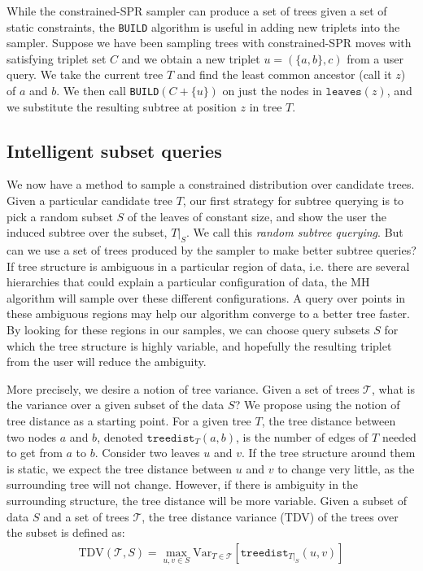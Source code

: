 While the constrained-SPR sampler can produce
a set of trees given a set of static constraints,
the \texttt{BUILD} algorithm is useful in
adding new triplets into the sampler.
Suppose we have been sampling trees with constrained-SPR moves
with satisfying triplet set $C$ 
and we obtain a new triplet $u = (\{a, b\}, c)$ from a user query. 
We take the current tree $T$ and find the least common ancestor 
(call it $z$) of $a$ and $b$. We then call 
\texttt{BUILD}$(C + \{u\})$ on just the nodes in 
$\texttt{leaves}(z)$, and 
we substitute the resulting subtree at position $z$ in tree $T$.

\subsection{Intelligent subset queries}
We now have a method to sample a constrained
distribution over candidate trees.
Given a particular candidate tree $T$,
our first strategy for subtree querying
is to pick a random subset $S$ of the leaves
of constant size, and show the user
the induced subtree over the subset, $T|_S$.
We call this \emph{random subtree querying}.
But can we use a set of trees produced by the sampler
to make better subtree queries?
If tree structure is ambiguous in a particular region of data,
i.e. there are several hierarchies that could explain
a particular configuration of data, 
the MH algorithm will sample over
these different configurations. A query over points
in these ambiguous regions may help our algorithm
converge to a better tree faster. By looking for
these regions in our samples, we can choose query
subsets $S$ for which the tree structure is highly variable, 
and hopefully the resulting triplet from the user will 
reduce the ambiguity.

More precisely, we desire a notion of tree variance.
Given a set of trees $\mathcal{T}$, what is the variance
over a given subset of the data $S$?
We propose using the notion of tree distance
as a starting point. 
For a given tree $T$, the tree distance between two nodes $a$ and $b$,
denoted $\texttt{treedist}_T(a, b)$,
is the number of edges of $T$ needed to get from $a$ to $b$.
Consider two leaves $u$ and $v$. If the tree structure around
them is static, we expect the tree distance
between $u$ and $v$ to change very little, as the surrounding tree
will not change. However, if there is
ambiguity in the surrounding structure, the tree distance will
be more variable.
Given a subset of data $S$ and a set of trees $\mathcal{T}$,
the tree distance variance (TDV) of the trees over the subset is defined as:
\begin{align}
    \text{TDV}(\mathcal{T}, S) = \max_{u, v \in S}\mathrm{Var}_{T \in \mathcal{T}}[\texttt{treedist}_{T|_S}(u, v)]
\end{align}

